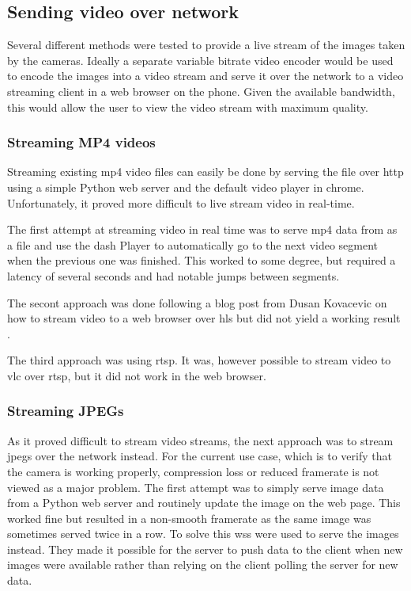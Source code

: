 
\subsection{Sending video over network}
Several different methods were tested to provide a live stream of the images taken by the cameras.
Ideally a separate variable bitrate video encoder would be used to encode the images into a video stream and serve it over the network to a video streaming client in a web browser on the phone.
Given the available bandwidth, this would allow the user to view the video stream with maximum quality.

\subsubsection{Streaming MP4 videos}
Streaming existing \gls{mp4} video files can easily be done by serving the file over \gls{http} using a simple Python web server and the default video player in \gls{chrome}.
Unfortunately, it proved more difficult to live stream video in real-time.

The first attempt at streaming video in real time was to serve \gls{mp4} data from \gs as a file and use the \gls{dash} Player to automatically go to the next video segment when the previous one was finished.
This worked to some degree, but required a latency of several seconds and had notable jumps between segments.

The secont approach was done following a blog post from Dusan Kovacevic on how to stream video to a web browser over \gls{hls} but did not yield a working result \cite{kovacevicStreamLiveVideo2020}.

The third approach was using \gls{rtsp}.
It was, however possible to stream video to \gls{vlc} over \gls{rtsp}, but it did not work in the web browser.

\subsubsection{Streaming JPEGs}
As it proved difficult to stream video streams, the next approach was to stream \glspl{jpeg} over the network instead.
For the current use case, which is to verify that the camera is working properly, compression loss or reduced framerate is not viewed as a major problem.
The first attempt was to simply serve image data from a Python web server and routinely update the image on the web page.
This worked fine but resulted in a non-smooth framerate as the same image was sometimes served twice in a row.
To solve this \glspl{ws} were used to serve the images instead.
They made it possible for the server to push data to the client when new images were available rather than relying on the client polling the server for new data.

